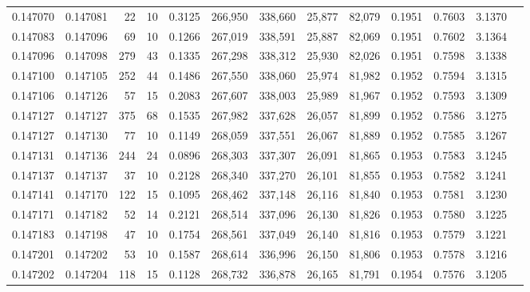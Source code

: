 \begin{tabular}{rrrrrrrrrrrrr}
0.147070 & 0.147081 &    22 &  10 &                                     0.3125 & 266,950 & 338,660 &  25,877 &  82,079 & 0.1951 & 0.7603 & 3.1370 \\
0.147083 & 0.147096 &    69 &  10 &                                     0.1266 & 267,019 & 338,591 &  25,887 &  82,069 & 0.1951 & 0.7602 & 3.1364 \\
0.147096 & 0.147098 &   279 &  43 &                                     0.1335 & 267,298 & 338,312 &  25,930 &  82,026 & 0.1951 & 0.7598 & 3.1338 \\
0.147100 & 0.147105 &   252 &  44 &                                     0.1486 & 267,550 & 338,060 &  25,974 &  81,982 & 0.1952 & 0.7594 & 3.1315 \\
0.147106 & 0.147126 &    57 &  15 &                                     0.2083 & 267,607 & 338,003 &  25,989 &  81,967 & 0.1952 & 0.7593 & 3.1309 \\
0.147127 & 0.147127 &   375 &  68 &                                     0.1535 & 267,982 & 337,628 &  26,057 &  81,899 & 0.1952 & 0.7586 & 3.1275 \\
0.147127 & 0.147130 &    77 &  10 &                                     0.1149 & 268,059 & 337,551 &  26,067 &  81,889 & 0.1952 & 0.7585 & 3.1267 \\
0.147131 & 0.147136 &   244 &  24 &                                     0.0896 & 268,303 & 337,307 &  26,091 &  81,865 & 0.1953 & 0.7583 & 3.1245 \\
0.147137 & 0.147137 &    37 &  10 &                                     0.2128 & 268,340 & 337,270 &  26,101 &  81,855 & 0.1953 & 0.7582 & 3.1241 \\
0.147141 & 0.147170 &   122 &  15 &                                     0.1095 & 268,462 & 337,148 &  26,116 &  81,840 & 0.1953 & 0.7581 & 3.1230 \\
0.147171 & 0.147182 &    52 &  14 &                                     0.2121 & 268,514 & 337,096 &  26,130 &  81,826 & 0.1953 & 0.7580 & 3.1225 \\
0.147183 & 0.147198 &    47 &  10 &                                     0.1754 & 268,561 & 337,049 &  26,140 &  81,816 & 0.1953 & 0.7579 & 3.1221 \\
0.147201 & 0.147202 &    53 &  10 &                                     0.1587 & 268,614 & 336,996 &  26,150 &  81,806 & 0.1953 & 0.7578 & 3.1216 \\
0.147202 & 0.147204 &   118 &  15 &                                     0.1128 & 268,732 & 336,878 &  26,165 &  81,791 & 0.1954 & 0.7576 & 3.1205 \\

\end{tabular}
